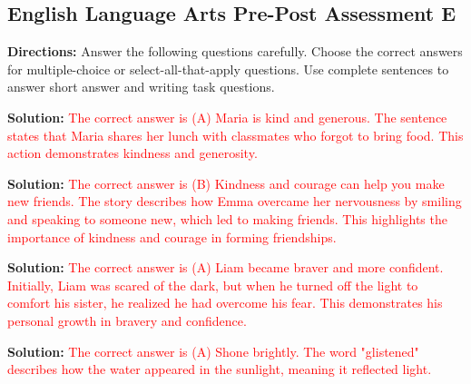 \documentclass[12pt]{article}
\begin{document}
\subsection*{English Language Arts Pre-Post Assessment E}
\onehalfspacing

\begin{tcolorbox}[colframe=black!50, colback=white, title=Assessment Directions]
\textbf{Directions:} Answer the following questions carefully. Choose the correct answers for multiple-choice or select-all-that-apply questions. Use complete sentences to answer short answer and writing task questions.
\end{tcolorbox}

\begin{tcolorbox}[colframe=black!50, colback=white, title=Question 1]
\textbf{Solution:} \textcolor{red}{The correct answer is (A) Maria is kind and generous. The sentence states that Maria shares her lunch with classmates who forgot to bring food. This action demonstrates kindness and generosity.}
\end{tcolorbox}

\begin{tcolorbox}[colframe=black!50, colback=white, title=Question 2]
\textbf{Solution:} \textcolor{red}{The correct answer is (B) Kindness and courage can help you make new friends. The story describes how Emma overcame her nervousness by smiling and speaking to someone new, which led to making friends. This highlights the importance of kindness and courage in forming friendships.}
\end{tcolorbox}

\begin{tcolorbox}[colframe=black!50, colback=white, title=Question 3]
\textbf{Solution:} \textcolor{red}{The correct answer is (A) Liam became braver and more confident. Initially, Liam was scared of the dark, but when he turned off the light to comfort his sister, he realized he had overcome his fear. This demonstrates his personal growth in bravery and confidence.}
\end{tcolorbox}

\begin{tcolorbox}[colframe=black!50, colback=white, title=Question 4]
\textbf{Solution:} \textcolor{red}{The correct answer is (A) Shone brightly. The word "glistened" describes how the water appeared in the sunlight, meaning it reflected light.}
\end{tcolorbox}
\end{document}
